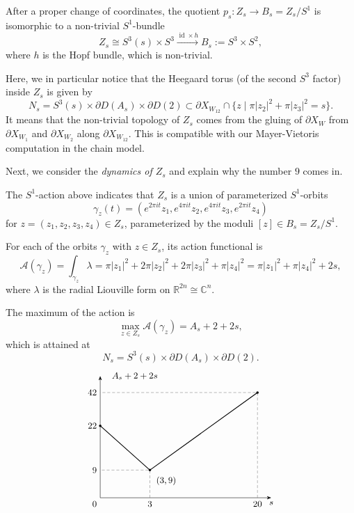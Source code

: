 \documentclass[11pt]{amsart}
\numberwithin{equation}{section}
\theoremstyle{plain}
\theoremstyle{definition}
\theoremstyle{remark}
\newcommand{\bC} { {\mathbb{C}}}
\newcommand{\bR} { {\mathbb{R}}}
\newcommand{\id}{{\operatorname{id}}}
\begin{document}
After a proper change of coordinates, the quotient $p_s:Z_s\to B_s=Z_s/S^1$ is isomorphic to a non-trivial $S^1$-bundle
\[Z_s\cong S^3(s)\times S^3\xrightarrow{\id\times h} B_s:=S^3 \times S^2,\]
where $h$ is the Hopf bundle, which is non-trivial.

Here, we in particular notice that the Heegaard torus (of the second $S^3$ factor) inside $Z_s$ is given by
\[N_s=S^3(s)\times \partial{D(A_s)}\times \partial{D(2)} \subset \partial X_{W_{12}}\cap \{z \mid \pi|z_2|^2+\pi|z_3|^2=s\}.\]
It means that the non-trivial topology of $Z_s$ comes from the gluing of $\partial X_{W}$ from $\partial X_{W_{1}}$ and $\partial X_{W_{2}}$ along $\partial X_{W_{12}}$. This is compatible with our Mayer-Vietoris computation in the chain model.

Next, we consider the \textit{dynamics of $Z_s$} and explain why the number $9$ comes in.

The $S^1$-action above indicates that $Z_s$ is a union of parameterized $S^1$-orbits 
\[\gamma_z(t)= (e^{2\pi i t} z_1,e^{4\pi i t} z_2,e^{4\pi i t} z_3,e^{2\pi i t} z_4)\] for $z=(z_1,z_2,z_3,z_4)\in Z_s$, parameterized by the moduli $[z]\in B_s=Z_s/S^1$.

For each of the orbits $\gamma_z$ with $z\in Z_s$, its action functional is 
\[\mathcal{A}(\gamma_z)=\int_{\gamma_z} \lambda = \pi|z_1|^2+2\pi|z_2|^2+2\pi|z_3|^2+\pi|z_4|^2=\pi|z_1|^2+\pi|z_4|^2+2s,\]
where $\lambda$ is the radial Liouville form on $\bR^{2n}\cong\bC^n$.

The maximum of the action is
\[\max_{z\in Z_s} \mathcal{A}(\gamma_z)= A_s+2+2s,\]
which is attained at
\[N_s=S^3(s)\times \partial{D(A_s)}\times \partial{D(2)} .\]
\[\begin{tikzpicture}[font=\small, >=Stealth]
    \coordinate (A) at (0,2.6);
    \coordinate (C) at (1.8,1);
    \coordinate (B) at (5.7,3.8);

    \draw[->] (0,0) -- (6.2,0) node[below] {$s$};
    \draw[->] (0,0) -- (0,4.4)
        node[right=3mm] {$A_s+2+2s$};

    \draw[gray,densely dashed]
        (1.8,0) -- (C) -- (0,1);
    \draw[gray,densely dashed]
        (5.7,0) -- (B) -- (0,3.8);

    \draw[thick] (A) -- (C) -- (B);
    \foreach \p in {A,C,B}
        \fill (\p) circle[radius=1.25pt];

    \node[below left] at (0,0) {$0$};
    \node[left] at (0,1) {$9$};
    \node[left] at (A) {$22$};
    \node[left] at (0,3.8) {$42$};
    \node[below] at (1.8,0) {$3$};
    \node[below] at (5.7,0) {$20$};
    \node[below right=3pt] at (C) {$(3,9)$};
\end{tikzpicture}\]
\end{document}
